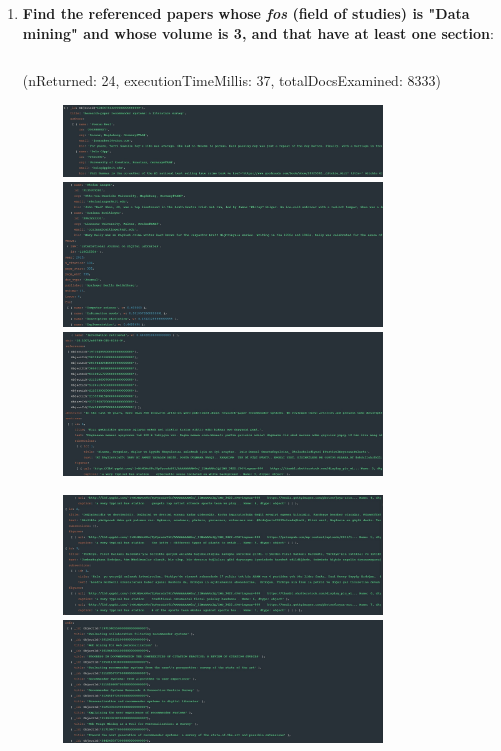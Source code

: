 \documentclass{Configuration_Files/PoliMi3i_thesis}
\begin{document}
\begin{enumerate}
    \item \textbf{Find the referenced papers whose \textit{fos} (field of studies) is "Data mining" and whose volume is 3, and that have at least one section}:
    \inputminted[linenos,tabsize=2,breaklines]{MQL}{code/queries_mongodb/query_10.txt}
    (nReturned: 24, executionTimeMillis: 37, totalDocsExamined: 8333)
    \begin{figure}[H]
        \centering
        \includegraphics[width=0.8\textwidth]{Images/queries_mongodb/query_10_1.jpg}
         \includegraphics[width=0.8\textwidth]{Images/queries_mongodb/query_10_2.jpg}        \includegraphics[width=0.8\textwidth]{Images/queries_mongodb/query_10_3.jpg}
     \end{figure}
     \begin{figure}[H]
        \centering
        \includegraphics[width=0.8\textwidth]{Images/queries_mongodb/query_10_4.jpg}
        \includegraphics[width=0.8\textwidth]{Images/queries_mongodb/query_10_5.jpg}
    \end{figure}
    

\end{enumerate}
\end{document}
